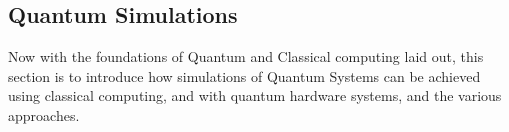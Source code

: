 \subsection{Quantum Simulations}
\label{sec:qSims}

\cite{javadi-abhari_quantum_2024}
\cite{larose2022}
Now with the foundations of Quantum and Classical computing laid out, this section is to introduce how simulations of Quantum Systems can be achieved using classical computing, and with quantum hardware systems, and the various approaches.


